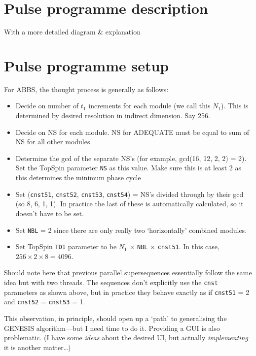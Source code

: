 \documentclass[a4paper,12pt]{article}
\newcommand{\todo}[1]{{\color{OrangeRed}#1}}
\begin{document}
\begin{refsection}
\startcontents[si]
\vfill
\hspace{0pt}
\newpage

\section{Pulse programme description}

With a more detailed diagram \& explanation

\section{Pulse programme setup}

For ABBS, the thought process is generally as follows:

\begin{itemize}
    \item Decide on number of $t_1$ increments for each module (we call this $N_1$). This is determined by desired resolution in indirect dimension. Say 256.
    \item Decide on NS for each module. NS for ADEQUATE must be equal to sum of NS for all other modules.
    \item Determine the gcd of the separate NS's (for example, gcd(16, 12, 2, 2) = 2). Set the TopSpin parameter \texttt{NS} as this value. Make sure this is at least 2 as this determines the minimum phase cycle
    \item Set (\texttt{cnst51}, \texttt{cnst52}, \texttt{cnst53}, \texttt{cnst54}) = NS's divided through by their gcd (so 8, 6, 1, 1). In practice the last of these is automatically calculated, so it doesn't have to be set.
    \item Set \texttt{NBL} = 2 since there are only really two `horizontally' combined modules.
    \item Set TopSpin \texttt{TD1} parameter to be $N_1$ $\times$ \texttt{NBL} $\times$ \texttt{cnst51}. In this case, $256 \times 2 \times 8 = 4096$.
\end{itemize}

\todo{
    Should note here that previous parallel supersequences\autocite{Kupce2021JACSA} essentially follow the same idea but with two threads.
    The sequences don't explicitly use the \texttt{cnst} parameters as shown above, but in practice they behave exactly as if \texttt{cnst51} = 2 and \texttt{cnst52} = \texttt{cnst53} = 1.

    This observation, in principle, should open up a `path' to generalising the GENESIS algorithm---but I need time to do it.
    Providing a GUI is also problematic.
    (I have some \textit{ideas} about the desired UI, but actually \textit{implementing} it is another matter\ldots{})
}




\end{refsection}
\end{document}
